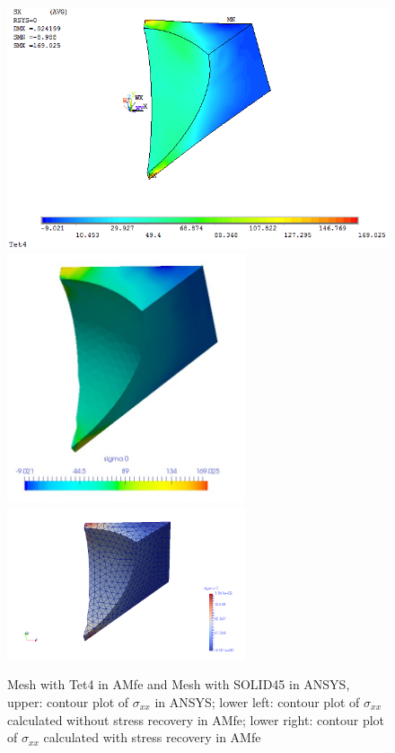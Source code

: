 \begin{figure}[htbp]
	\begin{center}
		\includegraphics[width=13cm,clip]{Tet4Sxx.png} 	
		\includegraphics[width=7cm,clip]{Tet4SxxPD.png} 	
		\includegraphics[width=7cm,clip]{Tet4SxxP.png} 		
		\caption{Mesh with Tet4 in AMfe and Mesh with SOLID45 in ANSYS, upper: contour plot of $\sigma_{xx}$ in ANSYS; lower left: contour plot of $\sigma_{xx}$ calculated without stress recovery in AMfe; lower right: contour plot of $\sigma_{xx}$ calculated with stress recovery in AMfe} \label{fig: Tet4_Sxx}
	\end{center}
\end{figure}
\clearpage 

